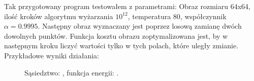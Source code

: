 \documentclass{article}
\begin{document}
        Tak przygotowany program testowałem z parametrami: Obraz rozmiaru 64x64, ilość kroków algorytmu wyżarzania $10^{12}$, temperatura 80, współczynnik $\alpha = 0.9995$. Następny obraz wyznaczany jest poprzez losową zamianę dwóch dowolnych punktów. Funkcja kosztu obrazu zoptymalizowana jest, by w następnym kroku liczyć wartości tylko w tych polach, które uległy zmianie.\\
        Przykładowe wyniki działania: 
                \begin{figure}[h!]
            \centering
            \caption{Sąsiedztwo: , funkcja energii: .}
        \end{figure}\\


        
\end{document}
